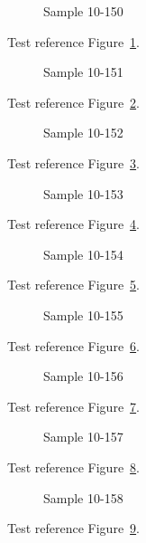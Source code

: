 \begin{figure}[tbhp]
\caption{Sample 10-150}
\label{fig:sample-10-150}
\end{figure}

Test reference Figure~\ref{fig:sample-10-150}.

\begin{figure}[tbhp]
\caption{Sample 10-151}
\label{fig:sample-10-151}
\end{figure}

Test reference Figure~\ref{fig:sample-10-151}.

\begin{figure}[tbhp]
\caption{Sample 10-152}
\label{fig:sample-10-152}
\end{figure}

Test reference Figure~\ref{fig:sample-10-152}.

\begin{figure}[tbhp]
\caption{Sample 10-153}
\label{fig:sample-10-153}
\end{figure}

Test reference Figure~\ref{fig:sample-10-153}.

\begin{figure}[tbhp]
\caption{Sample 10-154}
\label{fig:sample-10-154}
\end{figure}

Test reference Figure~\ref{fig:sample-10-154}.

\begin{figure}[tbhp]
\caption{Sample 10-155}
\label{fig:sample-10-155}
\end{figure}

Test reference Figure~\ref{fig:sample-10-155}.

\begin{figure}[tbhp]
\caption{Sample 10-156}
\label{fig:sample-10-156}
\end{figure}

Test reference Figure~\ref{fig:sample-10-156}.

\begin{figure}[tbhp]
\caption{Sample 10-157}
\label{fig:sample-10-157}
\end{figure}

Test reference Figure~\ref{fig:sample-10-157}.

\begin{figure}[tbhp]
\caption{Sample 10-158}
\label{fig:sample-10-158}
\end{figure}

Test reference Figure~\ref{fig:sample-10-158}.

